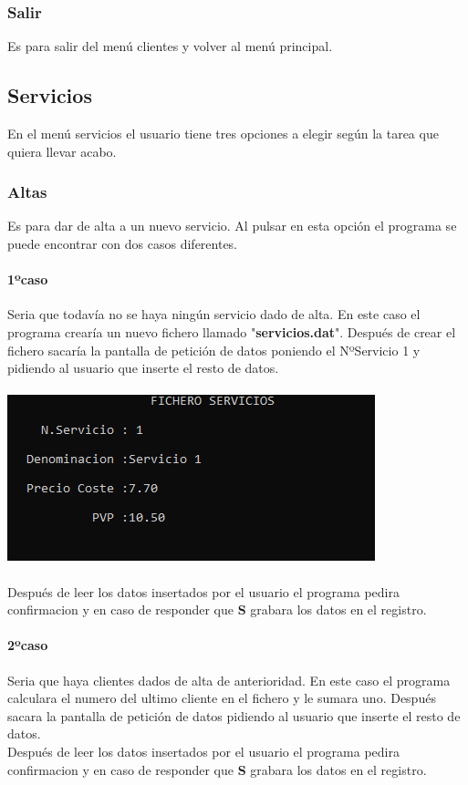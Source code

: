 \documentclass[12pt]{article}
\begin{document}
\subsubsection{Salir}
    Es para salir del menú clientes y volver al menú principal.
\subsection{Servicios}
En el menú servicios el usuario tiene tres opciones a elegir según la tarea que quiera llevar acabo.
\subsubsection{Altas}
Es para dar de alta a un nuevo servicio. Al pulsar en esta opción el programa se puede encontrar con dos casos diferentes.
\paragraph{1ºcaso}
Seria que todavía no se haya ningún servicio dado de alta. En este caso el programa crearía un nuevo fichero llamado "\textbf{servicios.dat}". Después de crear el fichero sacaría la pantalla de petición de datos poniendo el NºServicio 1 y pidiendo al usuario que inserte el resto de datos.\\\\
\includegraphics[]{PrimerServicioInsertado.PNG}\\\\
Después de leer los datos insertados por el usuario el programa pedira confirmacion y en caso de responder que \textbf{S} grabara los datos en el registro.

\paragraph{2ºcaso}
Seria que haya clientes dados de alta de anterioridad. En este caso el programa calculara el numero del ultimo cliente en el fichero y le sumara uno. Después sacara la pantalla de petición de datos pidiendo al usuario que inserte el resto de datos.\\
Después de leer los datos insertados por el usuario el programa pedira confirmacion y en caso de responder que \textbf{S} grabara los datos en el registro.
\end{document}
